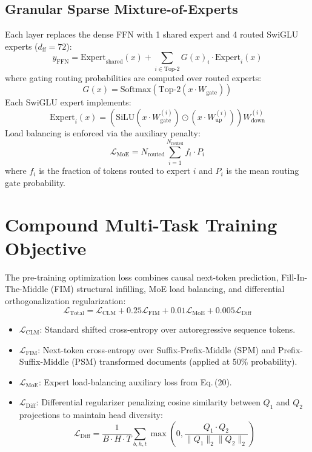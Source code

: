 \documentclass[10pt,twocolumn,letterpaper]{article}
\begin{document}
\subsection{Granular Sparse Mixture-of-Experts}
Each layer replaces the dense FFN with 1 shared expert and 4 routed SwiGLU experts ($d_{\text{ff}} = 72$):
\begin{equation}
    y_{\text{FFN}} = \text{Expert}_{\text{shared}}(x) + \sum_{i \in \text{Top-2}} G(x)_i \cdot \text{Expert}_i(x)
\end{equation}
where gating routing probabilities are computed over routed experts:
\begin{equation}
    G(x) = \text{Softmax}\left(\text{Top-2}(x \cdot W_{\text{gate}})\right)
\end{equation}
Each SwiGLU expert implements:
\begin{equation}
    \text{Expert}_i(x) = \left( \text{SiLU}(x \cdot W_{\text{gate}}^{(i)}) \odot (x \cdot W_{\text{up}}^{(i)}) \right) W_{\text{down}}^{(i)}
\end{equation}
Load balancing is enforced via the auxiliary penalty:
\begin{equation}
    \mathcal{L}_{\text{MoE}} = N_{\text{routed}} \sum_{i=1}^{N_{\text{routed}}} f_i \cdot P_i
\end{equation}
where $f_i$ is the fraction of tokens routed to expert $i$ and $P_i$ is the mean routing gate probability.

\section{Compound Multi-Task Training Objective}

The pre-training optimization loss combines causal next-token prediction, Fill-In-The-Middle (FIM) structural infilling, MoE load balancing, and differential orthogonalization regularization:
\begin{equation}
    \mathcal{L}_{\text{Total}} = \mathcal{L}_{\text{CLM}} + 0.25 \mathcal{L}_{\text{FIM}} + 0.01 \mathcal{L}_{\text{MoE}} + 0.005 \mathcal{L}_{\text{Diff}}
\end{equation}
\begin{itemize}
    \item $\mathcal{L}_{\text{CLM}}$: Standard shifted cross-entropy over autoregressive sequence tokens.
    \item $\mathcal{L}_{\text{FIM}}$: Next-token cross-entropy over Suffix-Prefix-Middle (SPM) and Prefix-Suffix-Middle (PSM) transformed documents (applied at 50\% probability).
    \item $\mathcal{L}_{\text{MoE}}$: Expert load-balancing auxiliary loss from Eq.\,(20).
    \item $\mathcal{L}_{\text{Diff}}$: Differential regularizer penalizing cosine similarity between $Q_1$ and $Q_2$ projections to maintain head diversity:
    \begin{equation}
        \mathcal{L}_{\text{Diff}} = \frac{1}{B \cdot H \cdot T} \sum_{b, h, t} \max\left(0, \frac{Q_1 \cdot Q_2}{\|Q_1\|_2 \|Q_2\|_2}\right)
    \end{equation}
\end{itemize}
\end{document}
